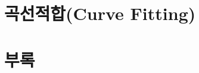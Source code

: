 \documentclass{article}
\numberwithin{equation}{section}
\numberwithin{figure}{section}
\numberwithin{algorithm}{section}
\theoremstyle{examplestyle}
\let\\\tabularnewline
\let\\\tabularnewline
\begin{document}
%
%

\clearpage
\part{곡선적합\\(Curve Fitting)}


\clearpage
\part{부록}
\begin{appendices}

%
% 
% 
% 
% 
% 
%
%
%
%
\end{appendices}
\end{document}
